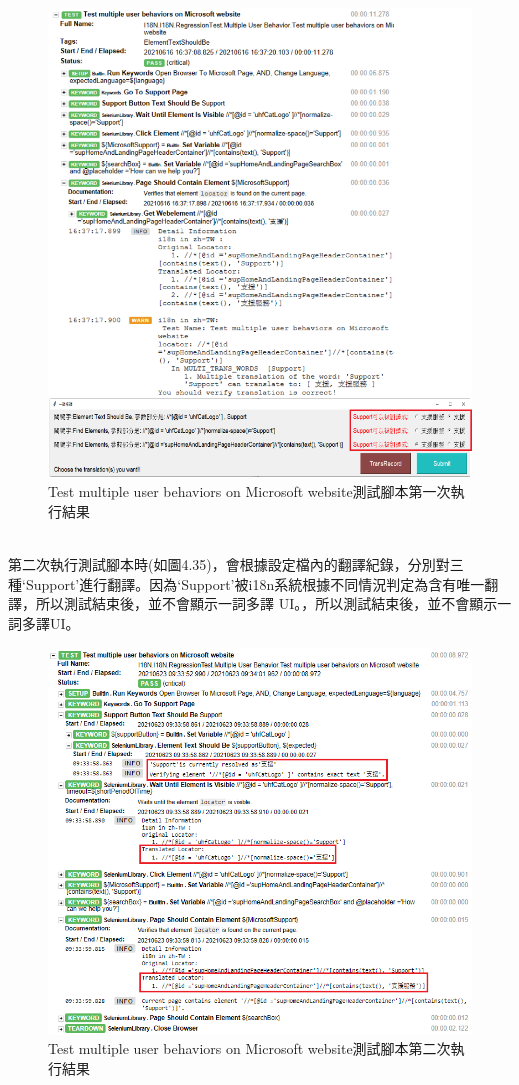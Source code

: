 \begin{figure}[H]
\includegraphics[width= \textwidth]{../論文截圖/4-4-2 test multiple user behaviors測試腳本1st run.png}
\caption{Test multiple user behaviors on Microsoft website測試腳本第一次執行結果}
\end{figure}
\hspace*{\fill} \\

第二次執行測試腳本時(如圖4.35)，會根據設定檔內的翻譯紀錄，分別對三種‘Support’進行翻譯。因為‘Support’被i18n系統根據不同情況判定為含有唯一翻譯，所以測試結束後，並不會顯示一詞多譯 UI。，所以測試結束後，並不會顯示一詞多譯UI。

\begin{figure}[H]
\centering
\includegraphics[width= .85\textwidth]{../論文截圖/4-4-3 test multiple user behaviors測試腳本2nd run.png}
\caption{Test multiple user behaviors on Microsoft website測試腳本第二次執行結果}
\end{figure}
